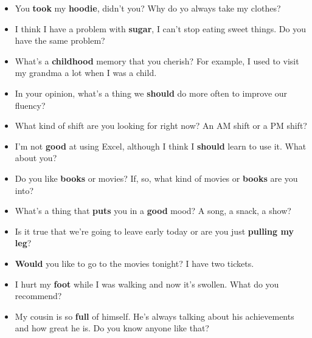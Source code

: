 \begin{itemize}
  \item You \textbf{took} my \textbf{hoodie}, didn't you? Why do yo always take my clothes?
  \item I think I have a problem with \textbf{sugar}, I can't stop eating sweet things. Do you have the same problem?
  \item What's a \textbf{childhood} memory that you cherish? For example, I used to visit my grandma a lot when I was a child.
  \item In your opinion, what's a thing we \textbf{should} do more often to improve our fluency?
  \item What kind of shift are you looking for right now? An AM shift or a PM shift?
  \item I'm not \textbf{good} at using Excel, although I think I \textbf{should} learn to use it. What about you?
  \item Do you like \textbf{books} or movies? If, so, what kind of movies or \textbf{books} are you into?
  \item What's a thing that \textbf{puts} you in a \textbf{good} mood? A song, a snack, a show?
  \item Is it true that we're going to leave early today or are you just \textbf{pulling my leg}?
  \item \textbf{Would} you like to go to the movies tonight? I have two tickets.
  \item I hurt my \textbf{foot} while I was walking and now it's swollen. What do you recommend?
  \item My cousin is so \textbf{full} of himself. He's always talking about his achievements and how great he is. Do you know anyone like that?
\end{itemize}


\newpage






